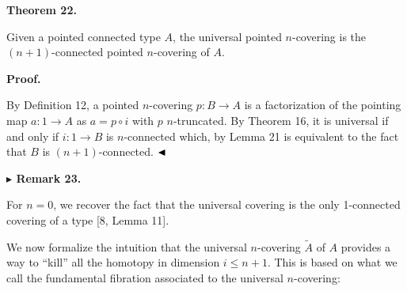  
 
 
\par\medskip\noindent\textbf{Theorem 22.}\par
 
 
Given a pointed connected type $A$, the universal pointed $n$-covering is the $(n{+}1)$-connected pointed $n$-covering of $A$.\par
 
 
 
 
 
\par\medskip\noindent\textbf{Proof.}\par
 
 
By Definition 12, a pointed $n$-covering $p:B\to A$ is a factorization of the pointing map $a:1\to A$ as $a=p\circ i$ with $p$ $n$-truncated. By Theorem 16, it is universal if and only if $i:1\to B$ is $n$-connected which, by Lemma 21 is equivalent to the fact that $B$ is $(n{+}1)$-connected. $\hfill\blacktriangleleft$\par
 
 
 
\par\medskip\noindent\textbf{$\blacktriangleright$ Remark 23.}\par
 
 
For $n=0$, we recover the fact that the universal covering is the only 1-connected covering of a type [8, Lemma 11].\par
 
 
 
 
We now formalize the intuition that the universal $n$-covering $\tilde{A}$ of $A$ provides a way to “kill” all the homotopy in dimension $i\leq n+1$. This is based on what we call the fundamental fibration associated to the universal $n$-covering:\par
 

